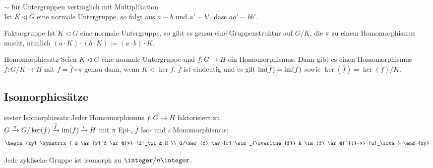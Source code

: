 \linie

\begin{Lemma}{$\sim$ für Untergruppen verträglich mit Multiplikation}\\
    Ist $K \vartriangleleft G$ eine normale Untergruppe, so folgt aus
    $a \sim b$ und $a' \sim b'$, dass $aa' \sim bb'$.
\end{Lemma}

\begin{Satz}{Faktorgruppe}
    Ist $K \vartriangleleft G$ eine normale Untergruppe, so gibt es genau
    eine Gruppenstruktur auf $G/K$, die $\pi$ zu einem Homomorphismus macht,
    nämlich $(a \cdot K) \cdot (b \cdot K) := (a \cdot b) \cdot K$.
\end{Satz}

\linie

\begin{Satz}{Homomorphiesatz}
    Seien $K \vartriangleleft G$ eine normale Untergruppe und
    $f\colon G \rightarrow H$ ein Homomorphismus.
    Dann gibt es einen Homomorphismus $\overline{f}\colon G/K \rightarrow H$
    mit $f = \overline{f} \circ \pi$ genau dann, wenn $K < \ker f$.
    $\overline{f}$ ist eindeutig und es gilt $\text{im}(\overline{f}) = \text{im}(f)$
    sowie $\ker(\overline{f}) = \ker(f) / K$.
\end{Satz}

\pagebreak

\subsection{%
    Isomorphiesätze%
}

\begin{Satz}{erster Isomorphiesatz}
    Jeder Homomorphismus $f\colon G \rightarrow H$ faktorisiert zu \\
    $G \xrightarrow{\pi} G/\ker(f) \xrightarrow{\overline{f}} \text{im}(f)
    \xrightarrow{\iota} H$
    mit $\pi$ Epi-, $\overline{f}$ Iso- und $\iota$ Monomorphismus:
    \begin{align*}
        \begin{xy}
            \xymatrix{
                G \ar[r]^f \ar @{>>} [d]_\pi &
                H \\
                G/\ker(f) \ar[r]^\sim_{\overline{f}} &
                \im(f) \ar @{^{(}->} [u]_\iota
            }
        \end{xy}
    \end{align*}
\end{Satz}

\begin{Kor}
    Jede zyklische Gruppe ist isomorph zu $\integer/n\integer$.
\end{Kor}

